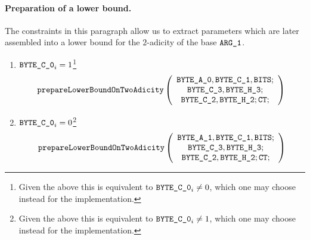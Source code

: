 \paragraph{Preparation of a lower bound.}
The constraints in this paragraph allow us to extract parameters which are later assembled into a lower bound for the $2$-adicity of the base $\texttt{ARG}\texttt{\_1}$.
\begin{enumerate}[resume]
	\item
	\If $\texttt{BYTE}\texttt{\_C\_0}_{i} = 1$\footnote{Given the above this is equivalent to $\texttt{BYTE}\texttt{\_C\_0}_{i} \neq 0$, which one may choose instead for the implementation.} \Then
	\[
			\texttt{prepareLowerBoundOnTwoAdicity}
			\left(
			\begin{array}{c}
			\texttt{BYTE}\texttt{\_A\_0},
			\texttt{BYTE}\texttt{\_C\_1},
			\texttt{BITS}; \\
			\texttt{BYTE}\texttt{\_C\_3},
			\texttt{BYTE}\texttt{\_H\_3}; \\
			\texttt{BYTE}\texttt{\_C\_2},
			\texttt{BYTE}\texttt{\_H\_2};
			\texttt{CT}{};
			\end{array}
			\right) \\
	\]
	\item \If $\texttt{BYTE}\texttt{\_C\_0}_{i} = 0$\footnote{Given the above this is equivalent to $\texttt{BYTE}\texttt{\_C\_0}_{i} \neq 1$, which one may choose instead for the implementation.} \Then
	\[
			\texttt{prepareLowerBoundOnTwoAdicity}
			\left(
			\begin{array}{c}
			\texttt{BYTE}\texttt{\_A\_1},
			\texttt{BYTE}\texttt{\_C\_1},
			\texttt{BITS}; \\
			\texttt{BYTE}\texttt{\_C\_3},
			\texttt{BYTE}\texttt{\_H\_3}; \\
			\texttt{BYTE}\texttt{\_C\_2},
			\texttt{BYTE}\texttt{\_H\_2};
			\texttt{CT}{};
			\end{array}
			\right)
	\]
\end{enumerate}


